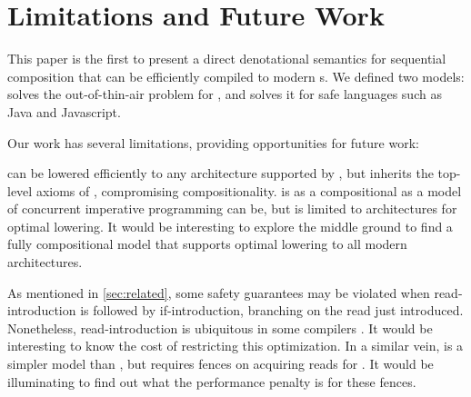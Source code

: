 \section{Limitations and Future Work}
\label{sec:outro}


This paper is the first to present a direct denotational semantics for
sequential composition that can be efficiently compiled to modern \CPU{}s.  We
defined two models: \PwTc{} solves the out-of-thin-air problem for \cXI, and
\PwTmca{} solves it for safe languages such as Java and Javascript.

Our work has several limitations, providing opportunities for future work:

\PwTc{} can be lowered efficiently to any architecture supported by \cXI{},
but inherits the top-level axioms of \rcXI{}, compromising compositionality.
\PwTmca{} is as a compositional as a model of concurrent imperative
programming can be, but is limited to \mca{} architectures for optimal
lowering.  It would be interesting to explore the middle ground to find a
fully compositional model that supports optimal lowering to all modern
architectures.

As mentioned in \textsection\ref{sec:related}, some safety guarantees may be
violated when read-introduction is followed by if-introduction, branching on
the read just introduced.  Nonetheless, read-introduction is ubiquitous in
some compilers \cite{DBLP:conf/pldi/LeeKSHDMRL17}.  It would be interesting
to know the cost of restricting this optimization.
%  
In a similar vein,  is a simpler model than , but
requires fences on acquiring reads for \armeight{}.  It would be illuminating
to find out what the performance penalty is for these fences.

